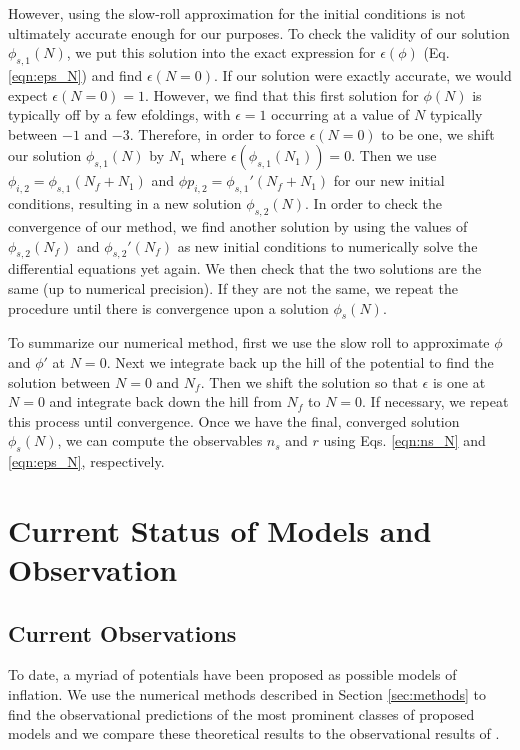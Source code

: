 \documentclass[a4paper,11pt]{article}
\begin{document}
However, using the slow-roll approximation for the initial conditions is not ultimately accurate enough for our purposes. To check the validity of our solution $\phi_{s,1}(N)$, we put this solution into the exact expression for $\epsilon(\phi)$ (Eq. \ref{eqn:eps_N}) and find $\epsilon(N=0)$. If our solution were exactly accurate, we would expect $\epsilon(N=0)=1$. However, we find that this first solution for $\phi(N)$ is typically off by a few efoldings, with $\epsilon=1$ occurring at a value of $N$ typically between $-1$ and $-3$. Therefore, in order to force $\epsilon(N=0)$ to be one, we shift our solution $\phi_{s,1}(N)$ by $N_1$ where $\epsilon(\phi_{s,1}(N_1))=0$. Then we use $\phi_{i,2} = \phi_{s,1}(N_f+N_1)$ and $\phi p_{i,2} = \phi_{s,1}'(N_f+N_1)$ for our new initial conditions, resulting in a new solution $\phi_{s,2}(N)$. In order to check the convergence of our method, we find another solution by using the values of $\phi_{s,2}(N_f)$ and $\phi_{s,2}'(N_f)$ as new initial conditions to numerically solve the differential equations yet again. We then check that the two solutions are the same (up to numerical precision). If they are not the same, we repeat the procedure until there is convergence upon a solution $\phi_s(N)$.

To summarize our numerical method, first we use the slow roll to approximate $\phi$ and $\phi'$ at $N=0$.  Next we integrate back up the hill of the potential to find the solution between $N=0$ and $N_f$. Then we shift the solution so that $\epsilon$ is one at $N=0$ and integrate back down the hill from $N_f$ to $N=0$. If necessary, we repeat this process until convergence. Once we have the final, converged solution $\phi_s(N)$, we can compute the observables $n_s$ and $r$ using Eqs. \ref{eqn:ns_N} and \ref{eqn:eps_N}, respectively.



\newpage
\section{Current Status of Models and Observation}

\subsection{Current Observations}
To date, a myriad of potentials have been proposed as possible models of inflation. We use the numerical methods described in Section \ref{sec:methods} to find the observational predictions of the most prominent classes of proposed models and we compare these theoretical results to the observational results of \citet{Planck2015}. 
\end{document}
